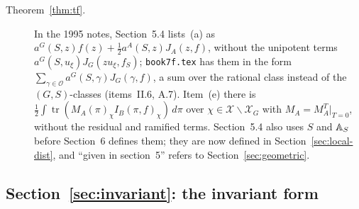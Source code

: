 \begin{description}
\item[Theorem~\ref{thm:tf}.] In the 1995 notes, Section~5.4 lists~(a) as
$a^G(S,z)f(z)+\frac12a^A(S,z)J_A(z,f)$, without the unipotent terms
$a^G(S,u_\xi)J_G(zu_\xi,f_S)$; \texttt{book7f.tex} has them in the form
$\sum_{\gamma\in\mathcal O}a^G(S,\gamma)J_G(\gamma,f)$, a sum over the
rational class instead of the $(G,S)$-classes (items~II.6, A.7).
Item~(e) there is $\frac12\int\operatorname{tr}(M_A(\pi)_\chi I_B(\pi,f)_
\chi)\,d\pi$ over $\chi\in\mathcal X\smallsetminus\mathcal X_G$ with
$M_A=M_A^T|_{T=0}$, without the residual and ramified terms. Section~5.4
also uses $S$ and $\mathbb{A}_S$ before Section~6 defines them; they are now
defined in Section~\ref{sec:local-dist}, and ``given in section~5''
refers to Section~\ref{sec:geometric}.

\end{description}

\subsection{Section~\ref{sec:invariant}: the invariant form}

